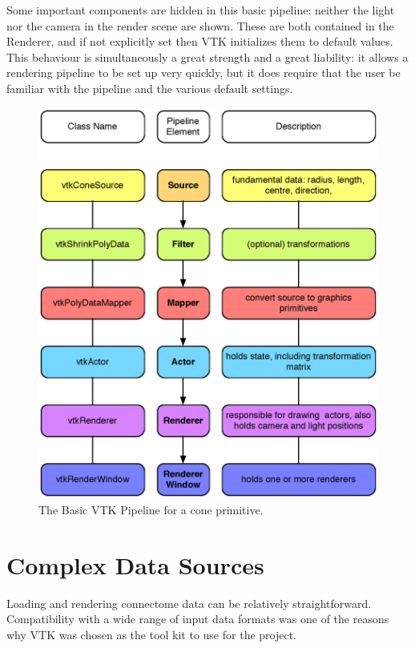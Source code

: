 \documentclass[MSc,paper=a4,pagesize=auto]{icldt}
\begin{document}
Some important components are hidden in this basic pipeline: neither the light nor the camera in the render scene are	 shown. These are both contained in the Renderer, and if not explicitly set then VTK initializes them to default values. This behaviour is simultaneously a great strength and a great liability: it allows a rendering pipeline to be set up very quickly, but it does require that the user be familiar with the pipeline and the various default settings.

\begin{figure}[htbp!]
    \centering
    \includegraphics[width=1\textwidth]{resources/vtk_pipeline}
    \caption{The Basic VTK Pipeline for a cone primitive.}
    \label{fig:vtk_pipeline}
\end{figure}


\section{Complex Data Sources}
Loading and rendering connectome data can be relatively straightforward. Compatibility with a wide range of input data formats was one of the reasons why VTK was chosen as the tool kit to use for the project.
\end{document}
